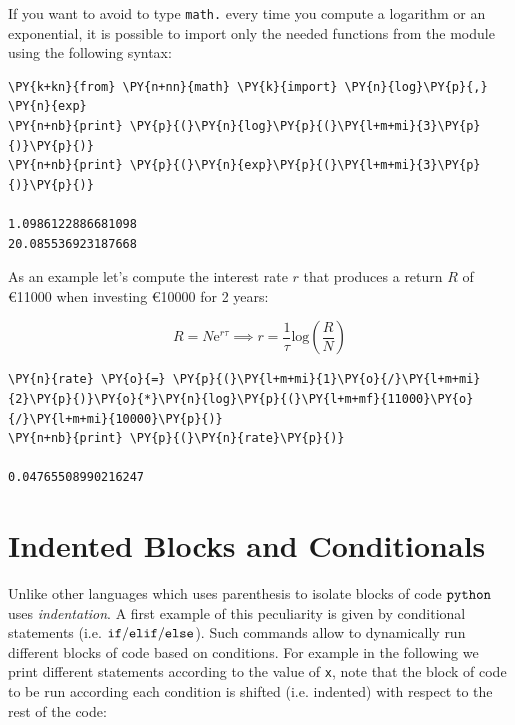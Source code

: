 If you want to avoid to type \texttt{math.} every time you compute a logarithm or an exponential, 
it is possible to import only the needed functions from the module using the following syntax:

\begin{codebox}            
\begin{Verbatim}[commandchars=\\\{\}]
\PY{k+kn}{from} \PY{n+nn}{math} \PY{k}{import} \PY{n}{log}\PY{p}{,} \PY{n}{exp}
\PY{n+nb}{print} \PY{p}{(}\PY{n}{log}\PY{p}{(}\PY{l+m+mi}{3}\PY{p}{)}\PY{p}{)}
\PY{n+nb}{print} \PY{p}{(}\PY{n}{exp}\PY{p}{(}\PY{l+m+mi}{3}\PY{p}{)}\PY{p}{)}

1.0986122886681098
20.085536923187668
\end{Verbatim}
\end{codebox}

As an example let's compute the interest rate \(r\) that produces a return \(R\) of 
\euro 11000 when investing \euro 10000 for 2 years:

\[R = N\mathrm{e}^{r\tau} \implies r = \frac{1}{\tau} \mathrm{log}(\frac{R}{N})\]

\begin{codebox}            
\begin{Verbatim}[commandchars=\\\{\}]
\PY{n}{rate} \PY{o}{=} \PY{p}{(}\PY{l+m+mi}{1}\PY{o}{/}\PY{l+m+mi}{2}\PY{p}{)}\PY{o}{*}\PY{n}{log}\PY{p}{(}\PY{l+m+mf}{11000}\PY{o}{/}\PY{l+m+mi}{10000}\PY{p}{)}
\PY{n+nb}{print} \PY{p}{(}\PY{n}{rate}\PY{p}{)}

0.04765508990216247
\end{Verbatim}
\end{codebox}

\section{Indented Blocks and Conditionals}
\label{indented-blocks-and-the-ttifelse-statement}

Unlike other languages which uses parenthesis to isolate blocks of code $\tt{python}$ 
uses \emph{indentation}. A first example of this peculiarity is given by conditional statements 
(i.e. $\tt{if/elif/else}$). Such commands allow to dynamically run different blocks of code 
based on conditions. For example in the following we print different statements according to 
the value of \texttt{x}, note that the block of code to be run according each condition 
is shifted (i.e. indented) with respect to the rest of the code:

